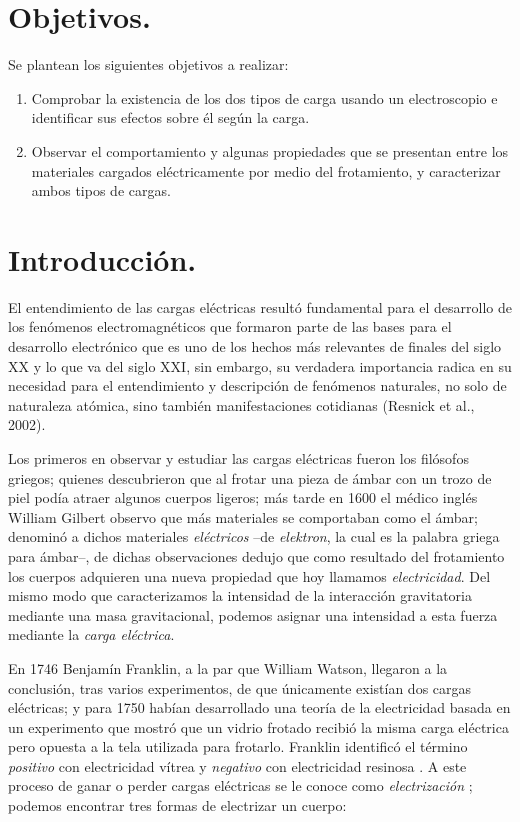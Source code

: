 \documentclass[letterpaper, 11 pt]{article}
\begin{document}
\begin{multicols*}{2}

\section{Objetivos.}
Se plantean los siguientes objetivos a realizar:

\begin{enumerate}
    \item Comprobar la existencia de los dos tipos de carga usando un electroscopio e identificar sus efectos sobre él según la carga.
    \item Observar el comportamiento y algunas propiedades que se presentan entre los materiales cargados eléctricamente por medio del frotamiento, y  caracterizar ambos tipos de cargas.
\end{enumerate}

\section{Introducción.}

El entendimiento de las cargas eléctricas resultó fundamental para el desarrollo de los fenómenos electromagnéticos que formaron parte de las bases para el desarrollo electrónico que es uno de los hechos más relevantes de finales del siglo XX y lo que va del siglo XXI, sin embargo, su verdadera importancia radica en su necesidad para el entendimiento y descripción de fenómenos naturales, no solo de naturaleza atómica, sino también manifestaciones cotidianas (Resnick et al., 2002).

Los primeros en observar y estudiar las cargas eléctricas fueron los filósofos griegos; quienes descubrieron que al frotar una pieza de ámbar con un trozo de piel podía atraer algunos cuerpos ligeros; más tarde en 1600 el médico inglés William Gilbert \cite{Roller1953} observo que más materiales se comportaban como el ámbar; denominó a dichos materiales \textit{eléctricos} --de \textit{elektron}, la cual es la palabra griega para ámbar--, de dichas observaciones dedujo que como resultado del frotamiento los cuerpos adquieren una nueva propiedad que hoy llamamos \textit{electricidad}. Del mismo modo que caracterizamos la intensidad de la interacción gravitatoria mediante una masa gravitacional, podemos asignar una intensidad a esta fuerza mediante la \textit{carga eléctrica}.


En 1746 Benjamín Franklin, a la par que William Watson, llegaron a la conclusión, tras varios experimentos, de que únicamente existían dos cargas eléctricas; y para 1750 habían desarrollado una teoría de la electricidad basada en un experimento que mostró que un vidrio frotado recibió la misma carga eléctrica pero opuesta a la tela utilizada para frotarlo. Franklin identificó el término \textit{positivo} con electricidad vítrea y \textit{negativo} con electricidad resinosa \cite{Roller1953}. A este proceso de ganar o perder cargas eléctricas se le conoce como \textit{electrización} \cite{hewitt2007}; podemos encontrar tres formas de electrizar un cuerpo:


\end{multicols*}
\end{document}
